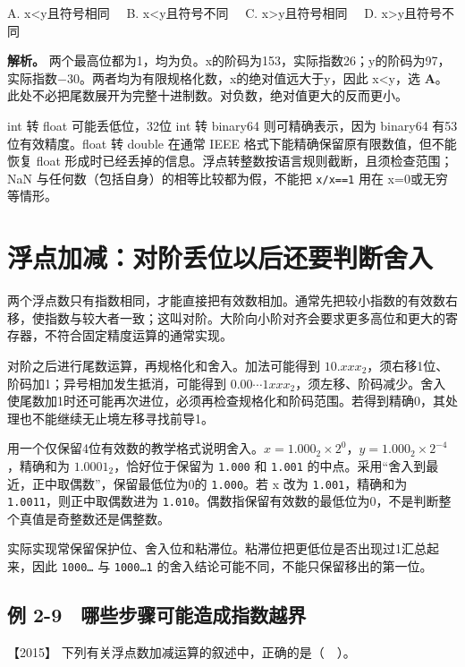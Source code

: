 A. x\textless y且符号相同　 B. x\textless y且符号不同　 C. x\textgreater y且符号相同　 D. x\textgreater y且符号不同


\textbf{解析。} 两个最高位都为1，均为负。x的阶码为153，实际指数26；y的阶码为97，实际指数−30。两者均为有限规格化数，x的绝对值远大于y，因此 x\textless y，选 \textbf{A}。此处不必把尾数展开为完整十进制数。对负数，绝对值更大的反而更小。

int 转 float 可能丢低位，32位 int 转 binary64 则可精确表示，因为 binary64 有53位有效精度。float 转 double 在通常 IEEE 格式下能精确保留原有限数值，但不能恢复 float 形成时已经丢掉的信息。浮点转整数按语言规则截断，且须检查范围；NaN 与任何数（包括自身）的相等比较都为假，不能把 \texttt{x/x==1} 用在 x=0或无穷等情形。

\section{浮点加减：对阶丢位以后还要判断舍入}\label{co-02-08}

两个浮点数只有指数相同，才能直接把有效数相加。通常先把较小指数的有效数右移，使指数与较大者一致；这叫对阶。大阶向小阶对齐会要求更多高位和更大的寄存器，不符合固定精度运算的通常实现。

对阶之后进行尾数运算，再规格化和舍入。加法可能得到 \(10.xxx_2\)，须右移1位、阶码加1；异号相加发生抵消，可能得到 \(0.00\cdots1xxx_2\)，须左移、阶码减少。舍入使尾数加1时还可能再次进位，必须再检查规格化和阶码范围。若得到精确0，其处理也不能继续无止境左移寻找前导1。

用一个仅保留4位有效数的教学格式说明舍入。\(x=1.000_2\times2^0\)，\(y=1.000_2\times2^{-4}\)，精确和为 \(1.0001_2\)，恰好位于保留为 \texttt{1.000} 和 \texttt{1.001} 的中点。采用``舍入到最近，正中取偶数''，保留最低位为0的 \texttt{1.000}。若 x 改为 \texttt{1.001}，精确和为 \texttt{1.0011}，则正中取偶数进为 \texttt{1.010}。偶数指保留有效数的最低位为0，不是判断整个真值是奇整数还是偶整数。

实际实现常保留保护位、舍入位和粘滞位。粘滞位把更低位是否出现过1汇总起来，因此 \texttt{1000…} 与 \texttt{1000…1} 的舍入结论可能不同，不能只保留移出的第一位。


\subsection{例 2-9　哪些步骤可能造成指数越界}\label{co-ex2-9}

\noindent{}【2015】 下列有关浮点数加减运算的叙述中，正确的是（　）。

